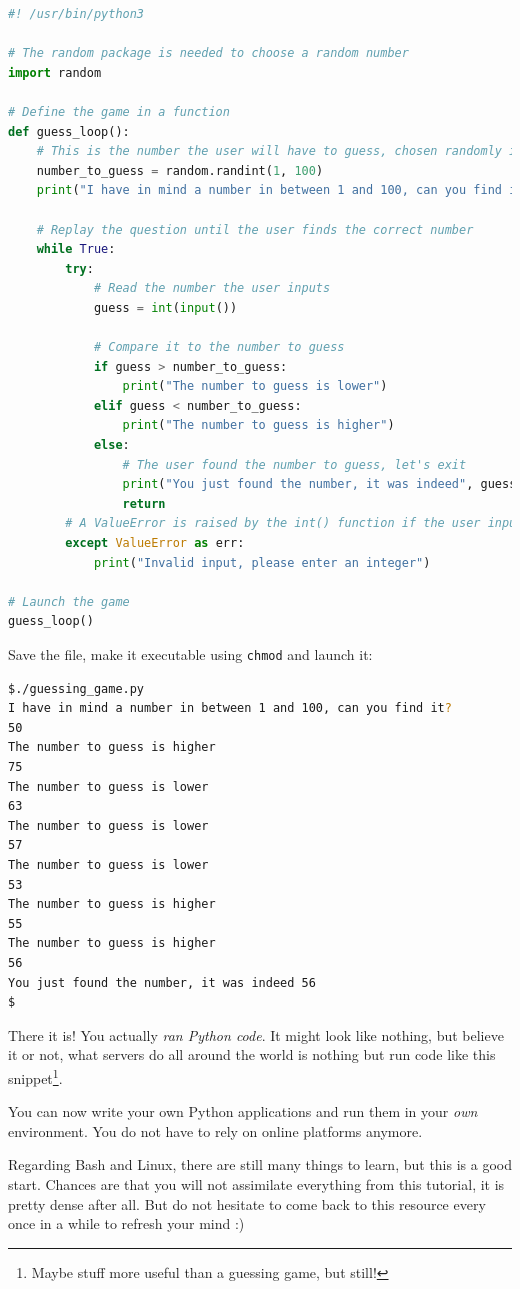 \documentclass[12pt]{article}
\begin{document}
\begin{lstlisting}[language=python]
#! /usr/bin/python3

# The random package is needed to choose a random number
import random

# Define the game in a function
def guess_loop():
    # This is the number the user will have to guess, chosen randomly in between 1 and 100
    number_to_guess = random.randint(1, 100)
    print("I have in mind a number in between 1 and 100, can you find it?")

    # Replay the question until the user finds the correct number
    while True:
        try:
            # Read the number the user inputs
            guess = int(input())

            # Compare it to the number to guess
            if guess > number_to_guess:
                print("The number to guess is lower")
            elif guess < number_to_guess:
                print("The number to guess is higher")
            else:
                # The user found the number to guess, let's exit
                print("You just found the number, it was indeed", guess)
                return
        # A ValueError is raised by the int() function if the user inputs something else than a number
        except ValueError as err:
            print("Invalid input, please enter an integer")

# Launch the game
guess_loop()
\end{lstlisting}

Save the file, make it executable using \texttt{chmod} and launch it:

\begin{lstlisting}[language=bash]
$./guessing_game.py 
I have in mind a number in between 1 and 100, can you find it?
50
The number to guess is higher
75
The number to guess is lower
63
The number to guess is lower
57
The number to guess is lower
53
The number to guess is higher
55
The number to guess is higher
56
You just found the number, it was indeed 56
$
\end{lstlisting}

There it is! You actually \textit{ran Python code}. It might look like nothing, but believe it or not, what servers do all around the world is nothing but run code like this snippet\footnote{Maybe stuff more useful than a guessing game, but still!}.

You can now write your own Python applications and run them in your \textit{own} environment. You do not have to rely on online platforms anymore.

Regarding Bash and Linux, there are still many things to learn, but this is a good start. Chances are that you will not assimilate everything from this tutorial, it is pretty dense after all. But do not hesitate to come back to this resource every once in a while to refresh your mind :)
\end{document}
